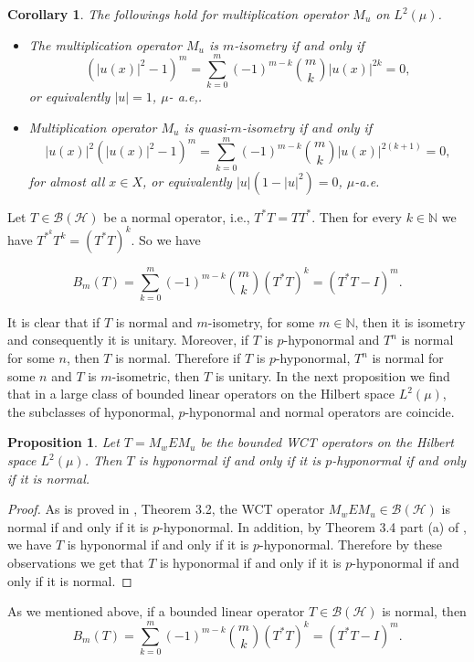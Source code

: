 \documentclass{amsart}
\newtheorem{cor}[thm]{Corollary}
\newtheorem{prop}[thm]{Proposition}
\theoremstyle{definition}\newtheorem{defn}[thm]{Definition}
\theoremstyle{remark}
\numberwithin{equation}{section}
\begin{document}
\begin{cor}
The followings hold for multiplication operator $M_u$ on $L^2(\mu)$.

\begin{itemize}
 \item  
The multiplication operator $M_u$ is $m$-isometry if and only if 
$$(|u(x)|^2-1)^m=\sum_{k=0}^{m}(-1)^{m-k}\binom{m}{k}|u(x)|^{2k}=0,$$
or equivalently $|u|=1$, $\mu$- a.e,.\\

\item Multiplication operator $M_u$ is quasi-$m$-isometry if and only if
$$|u(x)|^2(|u(x)|^2-1)^m=\sum_{k=0}^{m}(-1)^{m-k}\binom{m}{k}|u(x)|^{2(k+1)}=0,$$
 for almost all $x\in X$, or equivalently $|u|(1-|u|^2)=0$, $\mu$-a.e. 
 \end{itemize}
\end{cor}

Let $T\in \mathcal{B}(\mathcal{H})$ be a normal operator, i.e., $T^*T=TT^*$. Then for every $k\in \mathbb{N}$ we have $T^{*^k}T^k=(T^*T)^k$.
So we have 

$$B_m(T)=\sum_{k=0}^{m}(-1)^{m-k}\binom{m}{k}(T^*T)^{k}=(T^*T-I)^m.$$

It is clear that if $T$ is normal and $m$-isometry, for some $m\in \mathbb{N}$, then it is isometry and consequently it is unitary. Moreover, if $T$ is $p$-hyponormal and $T^n$ is normal for some $n$, then $T$ is normal. Therefore if $T$ is $p$-hyponormal, $T^n$ is normal for some $n$ and $T$ is $m$-isometric, then $T$ is unitary. In the next proposition we find that in a large class of bounded linear operators on the Hilbert space $L^2(\mu)$, the subclasses of hyponormal, $p$-hyponormal and normal operators are coincide. 
\begin{prop}\label{p2.4}
Let $T=M_wEM_u$ be the bounded WCT operators on the Hilbert space $L^2(\mu)$. Then $T$ is hyponormal if and only if it is $p$-hyponormal if and only if it is normal. 
\end{prop}
\begin{proof}
 As is proved in \cite{e}, Theorem 3.2, the WCT operator $M_wEM_u\in\mathcal{B}(\mathcal{H})$ is normal if and only if it is $p$-hyponormal. In addition, by Theorem 3.4 part (a) of \cite{ej}, we have $T$ is hyponormal if and only if it is $p$-hyponormal. Therefore by these observations we get that $T$ is hyponormal if and only if it is $p$-hyponormal if and only if it is normal. 
\end{proof}
As we mentioned above, if a bounded linear operator $T\in\mathcal{B(H)}$ is normal, then
 $$B_m(T)=\sum_{k=0}^{m}(-1)^{m-k}\binom{m}{k}(T^*T)^{k}=(T^*T-I)^m.$$
 
\end{document}

